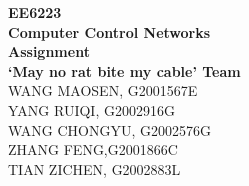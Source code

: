 \begin{titlepage}
\begin{center}


\vspace{1.2in}

{\Huge \textbf{EE6223}}\\[0.3in]
{\Huge \textbf{Computer Control Networks}}\\[1.2in]
{\Huge \textbf{Assignment }}\\[1.2in]

{\Large \textbf{`May no rat bite my cable' Team}}\\[0.1in]
{\normalsize
WANG MAOSEN, G2001567E\\[0.1in]
YANG RUIQI, G2002916G\\[0.1in]
WANG CHONGYU, G2002576G\\[0.1in]
ZHANG FENG,G2001866C\\[0.1in]
TIAN ZICHEN, G2002883L\\[0.1in]
}
 
\end{center}
\newpage
\end{titlepage}